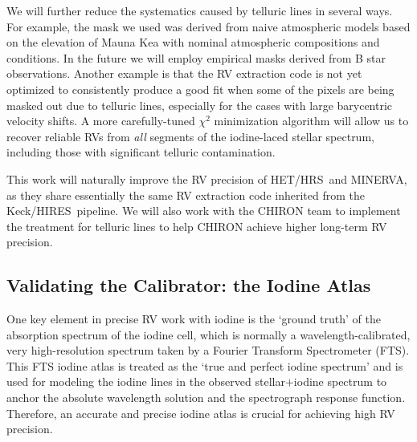 \documentclass[12pt]{article}
\def\minerva{MINERVA}
\def\hrs{HET/HRS}
\def\keck{Keck/HIRES}
\begin{document}
We will further reduce the systematics caused by telluric lines in
several ways. For example, the mask we used was derived from naive
atmospheric models based on the elevation of Mauna Kea with nominal
atmospheric compositions and conditions. In the future we will employ
empirical masks derived from B star observations. Another example is
that the RV extraction code is not yet optimized to consistently
produce a good fit when some of the pixels are being masked out due to
telluric lines, especially for the cases with large barycentric
velocity shifts. A more carefully-tuned $\chi^2$ minimization
algorithm will allow us to recover reliable RVs from \textit{all}
segments of the iodine-laced stellar spectrum, including those with
significant telluric contamination.

This work will naturally improve the RV precision of \hrs\ and
\minerva, as they share essentially the same RV extraction code
inherited from the \keck\ pipeline. We will also work with the CHIRON
team to implement the treatment for telluric lines to help CHIRON
achieve higher long-term RV precision.

\vspace{-3pt}
\subsection{Validating the Calibrator: the Iodine Atlas}\label{sec:fts}

One key element in precise RV work with iodine is the `ground truth'
of the absorption spectrum of the iodine cell, which is normally a
wavelength-calibrated, very high-resolution spectrum taken by a
Fourier Transform Spectrometer (FTS). This FTS iodine atlas is treated
as the `true and perfect iodine spectrum' and is used for modeling the
iodine lines in the observed stellar$+$iodine spectrum to anchor the
absolute wavelength solution and the spectrograph response
function. Therefore, an accurate and precise iodine atlas is crucial
for achieving high RV precision.
\end{document}
